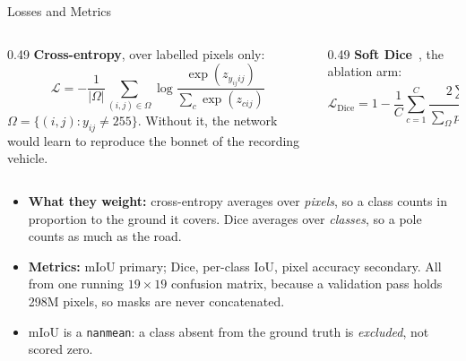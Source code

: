 \begin{frame}{Losses and Metrics}
\small
\begin{columns}[T]
\begin{column}{0.49\textwidth}
\textbf{Cross-entropy}, over labelled pixels only:
\begin{equation*}
    \mathcal{L} = -\frac{1}{|\Omega|}\!\!\sum_{(i,j) \in \Omega}\!\!
    \log \frac{\exp(z_{y_{ij}ij})}{\sum_c \exp(z_{cij})}
\end{equation*}
$\Omega = \{(i,j) : y_{ij} \neq 255\}$. Without it, the network would learn to reproduce the
bonnet of the recording vehicle.
\end{column}
\begin{column}{0.49\textwidth}
\textbf{Soft Dice}~\cite{milletari2016vnet}, the ablation arm:
\begin{equation*}
    \mathcal{L}_{\mathrm{Dice}} = 1 - \frac{1}{C}\sum_{c=1}^{C}
    \frac{2 \sum_\Omega p_{cij}\mathbf{1}[y_{ij}{=}c] + \varepsilon}
         {\sum_\Omega p_{cij} + \sum_\Omega \mathbf{1}[y_{ij}{=}c] + \varepsilon}
\end{equation*}
\end{column}
\end{columns}

\vspace{0.15cm}
\begin{itemize}
    \item \textbf{What they weight:} cross-entropy averages over \emph{pixels}, so a class counts
          in proportion to the ground it covers. Dice averages over \emph{classes}, so a pole
          counts as much as the road.
    \item \textbf{Metrics:} mIoU primary; Dice, per-class IoU, pixel accuracy secondary. All from
          one running $19 \times 19$ confusion matrix, because a validation pass holds 298M pixels, so
          masks are never concatenated.
    \item mIoU is a \texttt{nanmean}: a class absent from the ground truth is \emph{excluded},
          not scored zero.
\end{itemize}
\end{frame}

